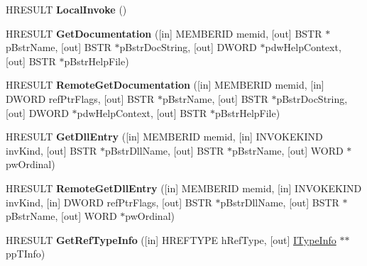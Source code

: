 \begin{DoxyCompactItemize}
\item 
\mbox{\label{interface_i_type_info_a6377005e7527b09cd24ad3e928dff64b}} 
H\+R\+E\+S\+U\+LT {\bfseries Local\+Invoke} ()
\item 
\mbox{\label{interface_i_type_info_a17fb90e479c4b117d21dba342c383092}} 
H\+R\+E\+S\+U\+LT {\bfseries Get\+Documentation} (\mbox{[}in\mbox{]} M\+E\+M\+B\+E\+R\+ID memid, \mbox{[}out\mbox{]} B\+S\+TR $\ast$p\+Bstr\+Name, \mbox{[}out\mbox{]} B\+S\+TR $\ast$p\+Bstr\+Doc\+String, \mbox{[}out\mbox{]} D\+W\+O\+RD $\ast$pdw\+Help\+Context, \mbox{[}out\mbox{]} B\+S\+TR $\ast$p\+Bstr\+Help\+File)
\item 
\mbox{\label{interface_i_type_info_ab5b3c300ce1af4be84185b9aae258ae7}} 
H\+R\+E\+S\+U\+LT {\bfseries Remote\+Get\+Documentation} (\mbox{[}in\mbox{]} M\+E\+M\+B\+E\+R\+ID memid, \mbox{[}in\mbox{]} D\+W\+O\+RD ref\+Ptr\+Flags, \mbox{[}out\mbox{]} B\+S\+TR $\ast$p\+Bstr\+Name, \mbox{[}out\mbox{]} B\+S\+TR $\ast$p\+Bstr\+Doc\+String, \mbox{[}out\mbox{]} D\+W\+O\+RD $\ast$pdw\+Help\+Context, \mbox{[}out\mbox{]} B\+S\+TR $\ast$p\+Bstr\+Help\+File)
\item 
\mbox{\label{interface_i_type_info_a742362dc857f4ed92773979958b3dd00}} 
H\+R\+E\+S\+U\+LT {\bfseries Get\+Dll\+Entry} (\mbox{[}in\mbox{]} M\+E\+M\+B\+E\+R\+ID memid, \mbox{[}in\mbox{]} I\+N\+V\+O\+K\+E\+K\+I\+ND inv\+Kind, \mbox{[}out\mbox{]} B\+S\+TR $\ast$p\+Bstr\+Dll\+Name, \mbox{[}out\mbox{]} B\+S\+TR $\ast$p\+Bstr\+Name, \mbox{[}out\mbox{]} W\+O\+RD $\ast$pw\+Ordinal)
\item 
\mbox{\label{interface_i_type_info_a00423d13214d48be55d14383ff93a6b0}} 
H\+R\+E\+S\+U\+LT {\bfseries Remote\+Get\+Dll\+Entry} (\mbox{[}in\mbox{]} M\+E\+M\+B\+E\+R\+ID memid, \mbox{[}in\mbox{]} I\+N\+V\+O\+K\+E\+K\+I\+ND inv\+Kind, \mbox{[}in\mbox{]} D\+W\+O\+RD ref\+Ptr\+Flags, \mbox{[}out\mbox{]} B\+S\+TR $\ast$p\+Bstr\+Dll\+Name, \mbox{[}out\mbox{]} B\+S\+TR $\ast$p\+Bstr\+Name, \mbox{[}out\mbox{]} W\+O\+RD $\ast$pw\+Ordinal)
\item 
\mbox{\label{interface_i_type_info_a8ec43b33f86fd3097c305c1db56d6403}} 
H\+R\+E\+S\+U\+LT {\bfseries Get\+Ref\+Type\+Info} (\mbox{[}in\mbox{]} H\+R\+E\+F\+T\+Y\+PE h\+Ref\+Type, \mbox{[}out\mbox{]} \hyperlink{interface_i_type_info}{I\+Type\+Info} $\ast$$\ast$pp\+T\+Info)
$$
\end{DoxyCompactItemize}
